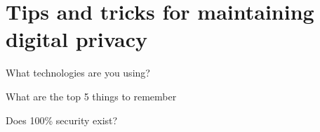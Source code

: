 \documentclass{exam}
\begin{document}
\section{Tips and tricks for maintaining digital privacy}
\begin{questions}


\question What technologies are you using? 

\begin{solutionorlines}[1.5in]
\end{solutionorlines}

\question What are the top 5 things to remember 
\begin{solutionorlines}[1in]
\end{solutionorlines}

\question Does 100\% security exist?
\begin{solutionorlines}[0.5in]
\end{solutionorlines}

\end{questions}
\end{document}
